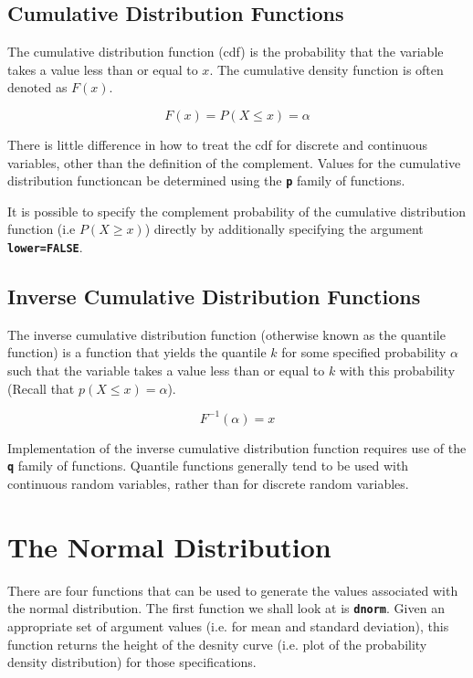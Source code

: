 \documentclass[a4paper,12pt]{article}
\begin{document}
\subsection{Cumulative Distribution Functions}

The cumulative distribution function (cdf) is the probability that the variable takes a value less than or equal to $x$. The cumulative density function is often denoted as $F(x)$.
 
 \[F(x)= P(X \leq x) = \alpha \]

There is little difference in how to treat the cdf for discrete and continuous variables, other than the definition of the complement.
Values for the cumulative distribution functioncan be determined using the \texttt{\textbf{p}} family of functions. 

It is possible to specify the complement probability of the cumulative distribution function (i.e $P(X \geq x)$) directly by additionally specifying the argument \texttt{\textbf{lower=FALSE}}.
 
\subsection{Inverse Cumulative Distribution Functions}

The inverse cumulative distribution function (otherwise known as the quantile function) is a function that yields the quantile $k$ for some specified probability $\alpha$ such that the variable takes a value less than or equal to $k$ with this probability (Recall that $p(X \leq x) = \alpha $).

\[F^{-1}(\alpha) = x  \]

Implementation of the inverse cumulative distribution function requires use of the \texttt{\textbf{q}} family of functions. Quantile functions generally tend to be used with continuous random variables, rather than for discrete random variables.
\newpage
\section{The Normal Distribution}

There are four functions that can be used to generate the values associated with the normal distribution.  
The first function we shall look at is \textbf{\texttt{dnorm}}. Given an appropriate set of argument values (i.e. for mean and standard deviation), this function returns the height of the desnity curve (i.e. plot of the probability density distribution) for those specifications. 
\end{document}
